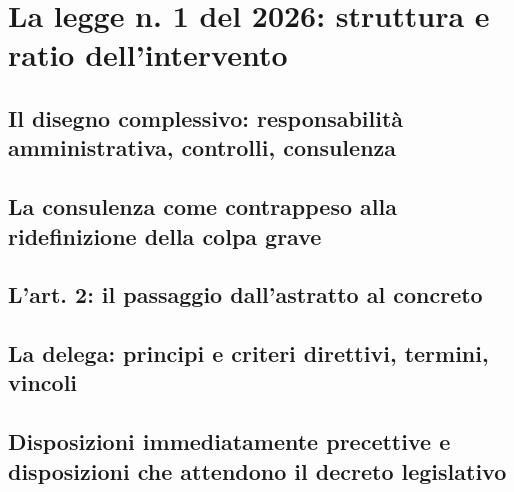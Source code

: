 

\chapter{La legge n. 1 del 2026: struttura e ratio dell'intervento}
\label{cap:cap3}

\section{Il disegno complessivo: responsabilità amministrativa, controlli, consulenza}
\label{sez:cap3:disegno}


\section{La consulenza come contrappeso alla ridefinizione della colpa grave}
\label{sez:cap3:contrappeso}


\section{L'art. 2: il passaggio dall'astratto al concreto}
\label{sez:cap3:art2}


\section{La delega: principi e criteri direttivi, termini, vincoli}
\label{sez:cap3:delega}


\section{Disposizioni immediatamente precettive e disposizioni che attendono il decreto legislativo}
\label{sez:cap3:precettivo}


